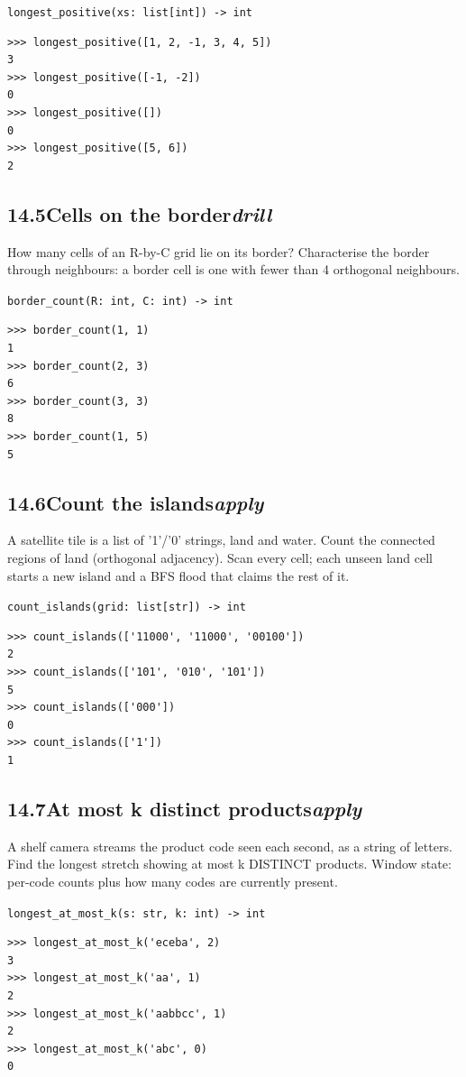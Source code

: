 \documentclass[10pt,letterpaper]{book}
\begin{document}
\noindent\texttt{longest\_positive(xs: list[int]) -> int}
\begin{lstlisting}[style=ex]
>>> longest_positive([1, 2, -1, 3, 4, 5])
3
>>> longest_positive([-1, -2])
0
>>> longest_positive([])
0
>>> longest_positive([5, 6])
2
\end{lstlisting}
\subsection*{14.5\quad Cells on the border\hfill\textnormal{\textit{drill}}}
How many cells of an R-by-C grid lie on its border? Characterise the border through neighbours: a border cell is one with fewer than 4 orthogonal neighbours.

\noindent\texttt{border\_count(R: int, C: int) -> int}
\begin{lstlisting}[style=ex]
>>> border_count(1, 1)
1
>>> border_count(2, 3)
6
>>> border_count(3, 3)
8
>>> border_count(1, 5)
5
\end{lstlisting}
\subsection*{14.6\quad Count the islands\hfill\textnormal{\textit{apply}}}
A satellite tile is a list of '1'/'0' strings, land and water. Count the connected regions of land (orthogonal adjacency). Scan every cell; each unseen land cell starts a new island and a BFS flood that claims the rest of it.

\noindent\texttt{count\_islands(grid: list[str]) -> int}
\begin{lstlisting}[style=ex]
>>> count_islands(['11000', '11000', '00100'])
2
>>> count_islands(['101', '010', '101'])
5
>>> count_islands(['000'])
0
>>> count_islands(['1'])
1
\end{lstlisting}
\subsection*{14.7\quad At most k distinct products\hfill\textnormal{\textit{apply}}}
A shelf camera streams the product code seen each second, as a string of letters. Find the longest stretch showing at most k DISTINCT products. Window state: per-code counts plus how many codes are currently present.

\noindent\texttt{longest\_at\_most\_k(s: str, k: int) -> int}
\begin{lstlisting}[style=ex]
>>> longest_at_most_k('eceba', 2)
3
>>> longest_at_most_k('aa', 1)
2
>>> longest_at_most_k('aabbcc', 1)
2
>>> longest_at_most_k('abc', 0)
0
\end{lstlisting}
\end{document}
